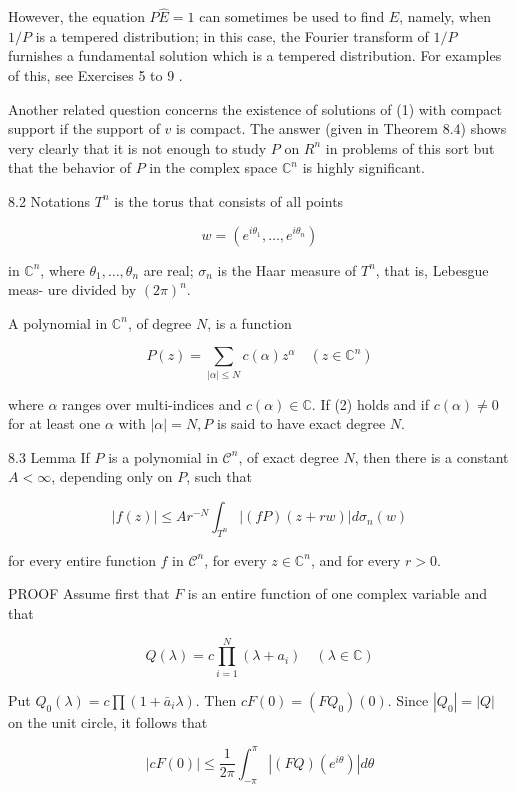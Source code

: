 \documentclass[10pt]{article}
\begin{document}
However, the equation $P \hat{E}=1$ can sometimes be used to find $E$, namely, when $1 / P$ is a tempered distribution; in this case, the Fourier transform of $1 / P$ furnishes a fundamental solution which is a tempered distribution. For examples of this, see
Exercises 5 to 9 .

Another related question concerns the existence of solutions of (1) with compact support if the support of $v$ is compact. The answer (given in Theorem 8.4) shows very clearly that it is not enough to study $P$ on $R^{n}$ in problems of this sort but that the behavior of $P$ in the complex space $\mathbb{C}^{n}$ is highly significant.

8.2 Notations $T^{n}$ is the torus that consists of all points

$$
w=\left(e^{i \theta_{1}}, \ldots, e^{i \theta_{n}}\right)
$$

in $\mathbb{C}^{n}$, where $\theta_{1}, \ldots, \theta_{n}$ are real; $\sigma_{n}$ is the Haar measure of $T^{n}$, that is, Lebesgue meas-
ure divided by $(2 \pi)^{n}$.

A polynomial in $\mathbb{C}^{n}$, of degree $N$, is a function

$$
P(z)=\sum_{|\alpha| \leq N} c(\alpha) z^{\alpha} \quad\left(z \in \mathbb{C}^{n}\right)
$$

where $\alpha$ ranges over multi-indices and $c(\alpha) \in \mathbb{C}$. If (2) holds and if $c(\alpha) \neq 0$ for at least one $\alpha$ with $|\alpha|=N, P$ is said to have exact degree $N$.

8.3 Lemma If $P$ is a polynomial in $\mathscr{C}^{n}$, of exact degree $N$, then there is a constant $A<\infty$, depending only on $P$, such that

$$
|f(z)| \leq A r^{-N} \int_{T^{n}}|(f P)(z+r w)| d \sigma_{n}(w)
$$

for every entire function $f$ in $\mathscr{C}^{n}$, for every $z \in \mathbb{C}^{n}$, and for every $r>0$.

PROOF Assume first that $F$ is an entire function of one complex variable and that

$$
Q(\lambda)=c \prod_{i=1}^{N}\left(\lambda+a_{i}\right) \quad(\lambda \in \mathbb{C})
$$

Put $Q_{0}(\lambda)=c \prod\left(1+\bar{a}_{i} \lambda\right)$. Then $c F(0)=\left(F Q_{0}\right)(0)$. Since $\left|Q_{0}\right|=|Q|$ on the unit circle, it follows that

$$
|c F(0)| \leq \frac{1}{2 \pi} \int_{-\pi}^{\pi}\left|(F Q)\left(e^{i \theta}\right)\right| d \theta
$$
\end{document}
